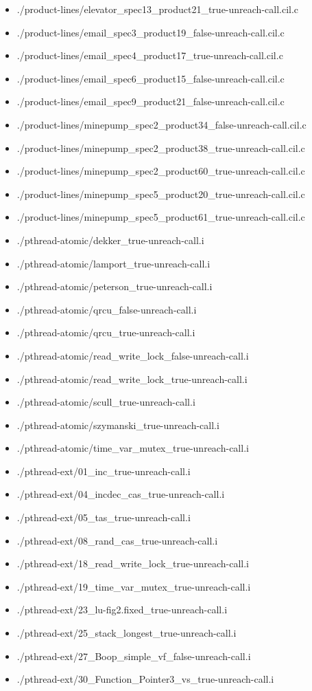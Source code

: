 \documentclass[envcountsame]{llncs}
\begin{document}
\begin{itemize}
\item ./product-lines/elevator\_spec13\_product21\_true-unreach-call.cil.c
\item ./product-lines/email\_spec3\_product19\_false-unreach-call.cil.c
\item ./product-lines/email\_spec4\_product17\_true-unreach-call.cil.c
\item ./product-lines/email\_spec6\_product15\_false-unreach-call.cil.c
\item ./product-lines/email\_spec9\_product21\_false-unreach-call.cil.c
\item ./product-lines/minepump\_spec2\_product34\_false-unreach-call.cil.c
\item ./product-lines/minepump\_spec2\_product38\_true-unreach-call.cil.c
\item ./product-lines/minepump\_spec2\_product60\_true-unreach-call.cil.c
\item ./product-lines/minepump\_spec5\_product20\_true-unreach-call.cil.c
\item ./product-lines/minepump\_spec5\_product61\_true-unreach-call.cil.c


\item ./pthread-atomic/dekker\_true-unreach-call.i
\item ./pthread-atomic/lamport\_true-unreach-call.i
\item ./pthread-atomic/peterson\_true-unreach-call.i
\item ./pthread-atomic/qrcu\_false-unreach-call.i
\item ./pthread-atomic/qrcu\_true-unreach-call.i
\item ./pthread-atomic/read\_write\_lock\_false-unreach-call.i
\item ./pthread-atomic/read\_write\_lock\_true-unreach-call.i
\item ./pthread-atomic/scull\_true-unreach-call.i
\item ./pthread-atomic/szymanski\_true-unreach-call.i
\item ./pthread-atomic/time\_var\_mutex\_true-unreach-call.i


\item ./pthread-ext/01\_inc\_true-unreach-call.i
\item ./pthread-ext/04\_incdec\_cas\_true-unreach-call.i
\item ./pthread-ext/05\_tas\_true-unreach-call.i
\item ./pthread-ext/08\_rand\_cas\_true-unreach-call.i
\item ./pthread-ext/18\_read\_write\_lock\_true-unreach-call.i
\item ./pthread-ext/19\_time\_var\_mutex\_true-unreach-call.i
\item ./pthread-ext/23\_lu-fig2.fixed\_true-unreach-call.i
\item ./pthread-ext/25\_stack\_longest\_true-unreach-call.i
\item ./pthread-ext/27\_Boop\_simple\_vf\_false-unreach-call.i
\item ./pthread-ext/30\_Function\_Pointer3\_vs\_true-unreach-call.i



\end{itemize}
\end{document}
